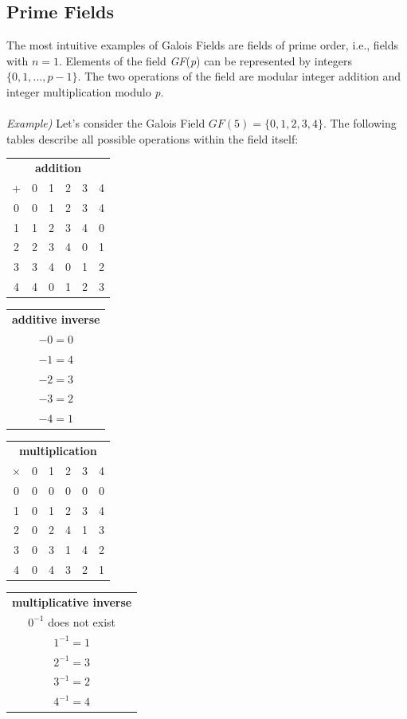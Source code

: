 \documentclass[11pt, a4paper]{article}
\newcommand{\gf}[1]{\textit{GF}(#1)}
\begin{document}
\subsection{Prime Fields}
The most intuitive examples of Galois Fields are fields of prime order, i.e., fields with $n=1$. Elements of the field \gf{\textit{p}} can be represented by integers $\{0,1,...,p-1\}$. The two operations of the field are modular integer addition and integer multiplication modulo \textit{p}.\\\\
\textit{Example)} Let's consider the Galois Field $\gf{5}=\{0,1,2,3,4\}$. The following tables describe all possible operations within the field itself:
\begin{center}
    \begin{tabular}{c|ccccc}
         \multicolumn{6}{c}{\textbf{addition}}\\
         +&0&1&2&3&4\\
         \hline
         0&0&1&2&3&4\\
         1&1&2&3&4&0\\
         2&2&3&4&0&1\\
         3&3&4&0&1&2\\
         4&4&0&1&2&3
    \end{tabular}\qquad
    \begin{tabular}{c}
         \textbf{additive inverse}\\
         $-0=0$\\
         $-1=4$\\
         $-2=3$\\
         $-3=2$\\
         $-4=1$
    \end{tabular}\qquad
    \begin{tabular}{c|ccccc}
         \multicolumn{6}{c}{\textbf{multiplication}}\\
         $\times$&0&1&2&3&4\\
         \hline
         0&0&0&0&0&0\\
         1&0&1&2&3&4\\
         2&0&2&4&1&3\\
         3&0&3&1&4&2\\
         4&0&4&3&2&1
    \end{tabular}\qquad
    \begin{tabular}{c}
         \textbf{multiplicative inverse}\\
         $0^{-1}$ does not exist\\
         $1^{-1}=1$\\
         $2^{-1}=3$\\
         $3^{-1}=2$\\
         $4^{-1}=4$
    \end{tabular}
\end{center}
\end{document}
